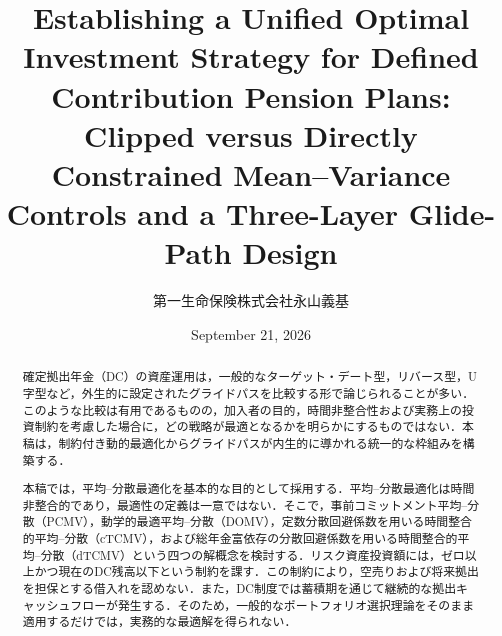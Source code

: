 \documentclass[10pt,a4paper]{article}
\title{Establishing a Unified Optimal Investment Strategy for Defined Contribution Pension Plans:\\
\large Clipped versus Directly Constrained Mean--Variance Controls and a Three-Layer Glide-Path Design}
\author{第一生命保険株式会社\quad 永山義基}
\date{September 21, 2026}
\theoremstyle{plain}
\theoremstyle{definition}
\begin{document}
\maketitle
\begin{abstract}
\begin{sloppypar}
確定拠出年金（DC）の資産運用は，一般的なターゲット・デート型，リバース型，U字型など，外生的に設定されたグライドパスを比較する形で論じられることが多い．このような比較は有用であるものの，加入者の目的，時間非整合性および実務上の投資制約を考慮した場合に，どの戦略が最適となるかを明らかにするものではない．本稿は，制約付き動的最適化からグライドパスが内生的に導かれる統一的な枠組みを構築する．

本稿では，平均--分散最適化を基本的な目的として採用する．平均--分散最適化は時間非整合的であり，最適性の定義は一意ではない．そこで，事前コミットメント平均--分散（PCMV），動学的最適平均--分散（DOMV），定数分散回避係数を用いる時間整合的平均--分散（cTCMV），および総年金富依存の分散回避係数を用いる時間整合的平均--分散（dTCMV）という四つの解概念を検討する．リスク資産投資額には，ゼロ以上かつ現在のDC残高以下という制約を課す．この制約により，空売りおよび将来拠出を担保とする借入れを認めない．また，DC制度では蓄積期を通じて継続的な拠出キャッシュフローが発生する．そのため，一般的なポートフォリオ選択理論をそのまま適用するだけでは，実務的な最適解を得られない．


\end{sloppypar}
\end{abstract}
\end{document}
